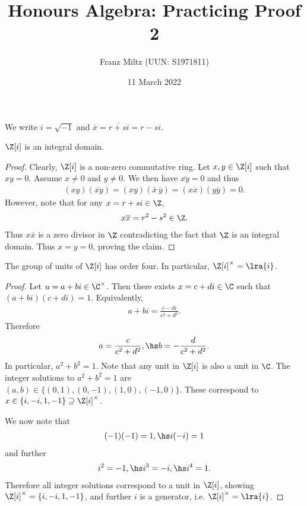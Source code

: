 \documentclass{article}
\begin{document}
\title{Honours Algebra: Practicing Proof 2}
\author{Franz Miltz (UUN: S1971811)}
\date{11 March 2022}
\maketitle
\newcommand{\gaussint}{\Z[i]}
We write $i=\sqrt{-1}$ and $\overline x = \overline{r+si} = r - si$.
\begin{claim*}[1]
   $\Z[i]$ is an integral domain.
   \begin{proof}
      Clearly, $\gaussint$ is a non-zero commutative ring. Let $x,y\in\gaussint$ such that 
      $xy=0$. Assume $x\not=0$ and $y\not=0$. We then have $\overline{xy}=0$ and thus 
      \begin{align*}
         (xy)(\overline{xy})=(xy)(\overline x\,\overline y)=(x\overline x)(y\overline y) = 0.
      \end{align*}
      However, note that for any $x=r+si\in\Z$, 
      \begin{align*}
         x\overline x = r^2-s^2 \in\Z.
      \end{align*}
      Thus $x\overline x$ is a zero divisor in $\Z$ contradicting the fact that $\Z$ is an 
      integral domain. Thus $x=y=0$, proving the claim.
   \end{proof}
\end{claim*}

\begin{claim*}[2]
   The group of units of $\gaussint$ has order four. In particular, $\gaussint^\times = \lra{i}$.
   \begin{proof}
      Let $u=a+bi\in\C^\times$. Then there exists $x=c+di\in\C$ such that $(a+bi)(c+di) = 1$.
      Equivalently,
      \begin{align*}
         a+bi = \frac{c-di}{c^2+d^2}.
      \end{align*}
      Therefore 
      \begin{align*}
         a = \frac{c}{c^2+d^2},\hs b=-\frac{d}{c^2+d^2}.
      \end{align*}
      In particular, $a^2+b^2=1$. Note that any unit in $\gaussint$ is also a unit in $\C$. 
      The integer solutions to $a^2+b^2=1$ are $(a,b)\in\{(0,1),(0,-1),(1,0),(-1,0)\}$.
      These correspond to $x\in\{i,-i,1,-1\}\supseteq\gaussint^\times$.

      We now note that 
      \begin{align*}
         (-1)(-1) = 1,\hs i(-i) = 1
      \end{align*}
      and further
      \begin{align*}
         i^2 = -1,\hs i^3 = -i, \hs i^4 = 1.
      \end{align*}
      Therefore all integer solutions correspond to a unit in $\gaussint$, showing 
      $\gaussint^\times=\{i,-i,1,-1\}$, and further $i$ is a generator, i.e. $\gaussint^\times=\lra{i}$.
   \end{proof}
\end{claim*}
\end{document}

